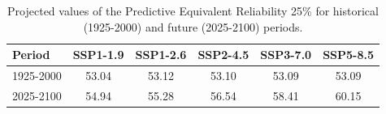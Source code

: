 \begin{table}[htbp]
\centering
\begin{tabular}{lccccc}
\toprule
Period & \textbf{SSP1-1.9} & \textbf{SSP1-2.6} & \textbf{SSP2-4.5} & \textbf{SSP3-7.0} & \textbf{SSP5-8.5} \\
\midrule
1925-2000 & 53.04 & 53.12 & 53.10 & 53.09 & 53.09 \\
2025-2100 & 54.94 & 55.28 & 56.54 & 58.41 & 60.15 \\
\bottomrule
\end{tabular}
\caption{Projected values of the Predictive Equivalent Reliability 25\% for historical (1925-2000) and future (2025-2100) periods.}
\label{tab:pred_scenarios_4per}
\end{table}